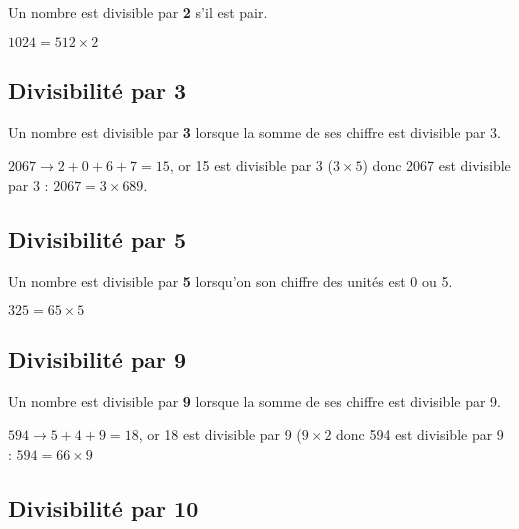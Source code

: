 \begin{pageCours}
\begin{Pp}
Un nombre est divisible par \textbf{2} s'il est pair.
\end{Pp}

\begin{Ex}
\(1024 = 512\times2\)
\end{Ex} 

\subsection{Divisibilité par 3}

\begin{Pp}
Un nombre est divisible par \textbf{3} lorsque la somme de ses chiffre est divisible par 3.
\end{Pp}

\begin{Ex}
\(2067 \rightarrow 2+0+6+7=15\), or 15 est divisible par 3 (\(3\times5\)) donc 2067 est divisible par 3 : \(2067=3\times689\).
\end{Ex}  

\subsection{Divisibilité par 5}

\begin{Pp}
Un nombre est divisible par \textbf{5} lorsqu'on son chiffre des unités est 0 ou 5.
\end{Pp} 

\begin{Ex}
\(325 = 65\times5\)
\end{Ex} 

\subsection{Divisibilité par 9}

\begin{Pp}
Un nombre est divisible par \textbf{9} lorsque la somme de ses chiffre est divisible par 9.
\end{Pp}

\begin{Ex}
\(594 \rightarrow 5+4+9 = 18\), or 18 est divisible par 9 (\(9\times2\) donc 594 est divisible par 9 : \(594=66\times9\)
\end{Ex}

\subsection{Divisibilité par 10}


\end{pageCours}
